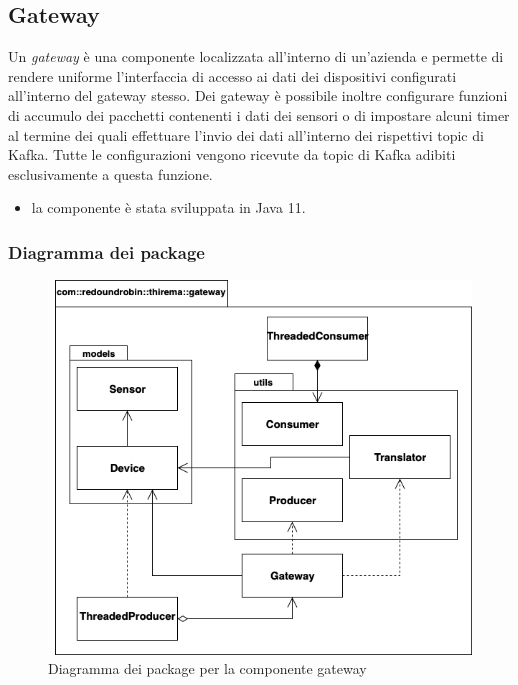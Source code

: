 \subsection{Gateway}
Un \textit{gateway} è una componente localizzata all'interno di un'azienda e permette di rendere uniforme l'interfaccia di accesso ai dati dei dispositivi configurati all'interno del gateway stesso.
	Dei gateway è possibile inoltre configurare funzioni di accumulo dei pacchetti contenenti i dati dei sensori o di impostare alcuni timer al termine dei quali effettuare l'invio dei dati all'interno dei rispettivi topic di Kafka.
	Tutte le configurazioni vengono ricevute da topic di Kafka adibiti esclusivamente a questa funzione.
	\begin{itemize}
		\item la componente è stata sviluppata in Java 11.
	\end{itemize}
	
	\subsubsection{Diagramma dei package}%
	  	\begin{figure}[H]
			\centering
			\includegraphics[scale=0.550]{res/images/GATEWAY/GatewayPackage.png}
			\caption{Diagramma dei package per la componente gateway}
			\label{Diagramma 1}
		\end{figure}
		\newpage		

